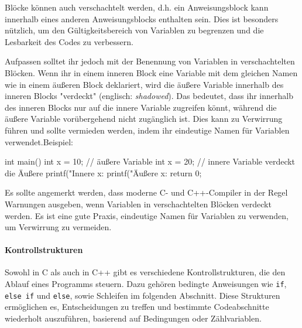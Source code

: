 Blöcke können auch verschachtelt werden, d.h. ein Anweisungsblock kann innerhalb eines anderen Anweisungsblocks enthalten sein. Dies ist besonders nützlich, um den Gültigkeitsbereich von Variablen zu begrenzen und die Lesbarkeit des Codes zu verbessern.

Aufpassen solltet ihr jedoch mit der Benennung von Variablen in verschachtelten Blöcken. Wenn ihr in einem inneren Block eine Variable mit dem gleichen Namen wie in einem äußeren Block deklariert, wird die äußere Variable innerhalb des inneren Blocks "verdeckt" (englisch: \textit{shadowed}). Das bedeutet, dass ihr innerhalb des inneren Blocks nur auf die innere Variable zugreifen könnt, während die äußere Variable vorübergehend nicht zugänglich ist. Dies kann zu Verwirrung führen und sollte vermieden werden, indem ihr eindeutige Namen für Variablen verwendet.Beispiel:
\begin{code}
int main() {
    int x = 10; // äußere Variable
    {
        int x = 20; // innere Variable verdeckt die Äußere
        printf("Innere x: %
    }
    printf("Äußere x: %
    return 0;
}
\end{code}
Es sollte angemerkt werden, dass moderne C- und C++-Compiler in der Regel Warnungen ausgeben, wenn Variablen in verschachtelten Blöcken verdeckt werden. Es ist eine gute Praxis, eindeutige Namen für Variablen zu verwenden, um Verwirrung zu vermeiden.

\paragraph{Kontrollstrukturen}
\label{sec:referenz:c:kontrollstrukturen}

Sowohl in C als auch in C++ gibt es verschiedene Kontrollstrukturen, die den Ablauf eines Programms steuern. Dazu gehören bedingte Anweisungen wie \texttt{if}, \texttt{else if} und \texttt{else}, sowie Schleifen im folgenden Abschnitt. Diese Strukturen ermöglichen es, Entscheidungen zu treffen und bestimmte Codeabschnitte wiederholt auszuführen, basierend auf Bedingungen oder Zählvariablen.

